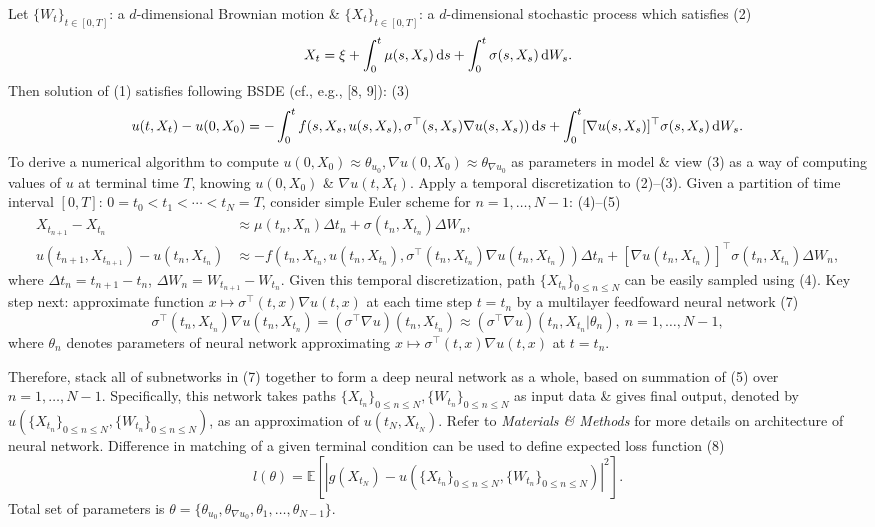 \documentclass{article}
\begin{document}
\begin{itemize}
	Let $\{W_t\}_{t\in[0,T]}$: a $d$-dimensional Brownian motion \& $\{X_t\}_{t\in[0,T]}$: a $d$-dimensional stochastic process which satisfies (2)
	\begin{equation*}
		X_t = \xi + \int_0^t \mu(s,X_s)\,{\rm d}s + \int_0^t \sigma(s,X_s)\,{\rm d}W_s.
	\end{equation*}
	Then solution of (1) satisfies following BSDE (cf., e.g., [8, 9]): (3)
	\begin{equation*}
		u(t,X_t) - u(0,X_0) = -\int_0^t f(s,X_s,u(s,X_s),\sigma^\top(s,X_s)\nabla u(s,X_s))\,{\rm d}s + \int_0^t [\nabla u(s,X_s)]^\top\sigma(s,X_s)\,{\rm d}W_s.
	\end{equation*}
	To derive a numerical algorithm to compute $u(0,X_0)\approx\theta_{u_0},\nabla u(0,X_0)\approx\theta_{\nabla u_0}$ as parameters in model \& view (3) as a way of computing values of $u$ at terminal time $T$, knowing $u(0,X_0)$ \& $\nabla u(t,X_t)$. Apply a temporal discretization to (2)--(3). Given a partition of time interval $[0,T]$: $0 = t_0 < t_1 < \cdots < t_N = T$, consider simple Euler scheme for $n = 1,\ldots,N - 1$: (4)--(5)
	\begin{align*}
		X_{t_{n+1}} - X_{t_n}&\approx\mu(t_n,X_n)\Delta t_n + \sigma(t_n,X_{t_n})\Delta W_n,\\
		u(t_{n+1},X_{t_{n+1}}) - u(t_n,X_{t_n})&\approx-f(t_n,X_{t_n},u(t_n,X_{t_n}),\sigma^\top(t_n,X_{t_n})\nabla u(t_n,X_{t_n}))\Delta t_n + [\nabla u(t_n,X_{t_n})]^\top\sigma(t_n,X_{t_n})\Delta W_n,
	\end{align*}
	where $\Delta t_n = t_{n+1} - t_n$, $\Delta W_n = W_{t_{n+1}} - W_{t_n}$. Given this temporal discretization, path $\{X_{t_n}\}_{0\le n\le N}$ can be easily sampled using (4). Key step next: approximate function $x\mapsto\sigma^\top(t,x)\nabla u(t,x)$ at each time step $t = t_n$ by a multilayer feedfoward neural network (7)
	\begin{equation*}
		\sigma^\top(t_n,X_{t_n})\nabla u(t_n,X_{t_n}) = (\sigma^\top\nabla u)(t_n,X_{t_n})\approx(\sigma^\top\nabla u)(t_n,X_{t_n}|\theta_n),\ n = 1,\ldots,N - 1,
	\end{equation*}
	where $\theta_n$ denotes parameters of neural network approximating $x\mapsto\sigma^\top(t,x)\nabla u(t,x)$ at $t = t_n$.

	Therefore, stack all of subnetworks in (7) together to form a deep neural network as a whole, based on summation of (5) over $n = 1,\ldots,N - 1$. Specifically, this network takes paths $\{X_{t_n}\}_{0\le n\le N},\{W_{t_n}\}_{0\le n\le N}$ as input data \& gives final output, denoted by $\hat{u}(\{X_{t_n}\}_{0\le n\le N},\{W_{t_n}\}_{0\le n\le N})$, as an approximation of $u(t_N,X_{t_N})$. Refer to {\it Materials \& Methods} for more details on architecture of neural network. Difference in matching of a given terminal condition can be used to define expected loss function (8)
	\begin{equation*}
		l(\theta) = \mathbb{E}\left[|g(X_{t_N}) - \hat{u}(\{X_{t_n}\}_{0\le n\le N},\{W_{t_n}\}_{0\le n\le N})|^2\right].
	\end{equation*}
	Total set of parameters is $\theta = \{\theta_{u_0},\theta_{\nabla u_0},\theta_1,\ldots,\theta_{N-1}\}$.


\end{itemize}
\end{document}
